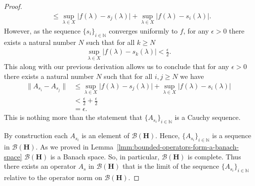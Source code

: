 \begin{proof}
\begin{align}
                          &\le \sup_{\lambda \in X} \lvert f(\lambda) - s_j(\lambda) \rvert + \sup_{\lambda \in X} \lvert f(\lambda) - s_i(\lambda) \rvert.
\end{align}
However, as the sequence $\{s_i\}_{i \in \mathbb{N}}$ converges uniformly to $f$, for any $\epsilon > 0$ there exists a natural number $N$ such that for all $k \ge N$
\begin{align}
    \sup_{\lambda \in X}  \lvert f(\lambda) - s_k(\lambda) \rvert < \frac{\epsilon}{2}.
\end{align}
This along with our previous derivation allows us to conclude that for any $\epsilon > 0$ there exists a natural number $N$ such that for all $i, j \ge N$ we have
\begin{align}
    \|A_{s_i} - A_{s_j}\| &\le \sup_{\lambda \in X} \lvert f(\lambda) - s_j(\lambda) \rvert + \sup_{\lambda \in X} \lvert f(\lambda) - s_i(\lambda) \rvert \\
                          &< \frac{\epsilon}{2} + \frac{\epsilon}{2} \\
                          &= \epsilon.
\end{align}
This is nothing more than the statement that $\{A_{s_i}\}_{i \in \mathbb{N}}$ is a Cauchy sequence.

By construction each $A_{s_i}$ is an element of $\mathcal{B}(\mathbf{H})$. Hence, $\{A_{s_i}\}_{i \in \mathbb{N}}$ is a sequence in $\mathcal{B}(\mathbf{H})$. As we proved in Lemma~\ref{lmm:bounded-operators-form-a-banach-space} $\mathcal{B}(\mathbf{H})$ is a Banach space. So, in particular, $\mathcal{B}(\mathbf{H})$ is complete. Thus there exists an operator $A_s$ in $\mathcal{B}(\mathbf{H})$ that is the limit of the sequence $\{A_{s_i}\}_{i \in \mathbb{N}}$ relative to the operator norm on $\mathcal{B}(\mathbf{H})$.


\end{proof}
